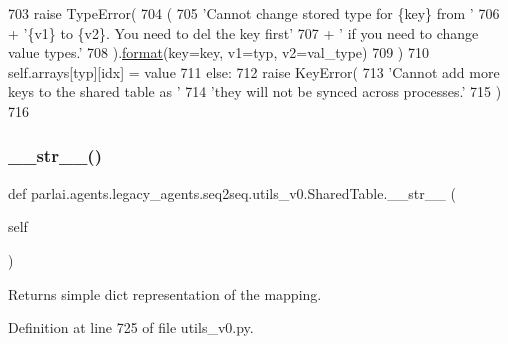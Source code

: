 \begin{DoxyCode}
703                 \textcolor{keywordflow}{raise} TypeError(
704                     (
705                         \textcolor{stringliteral}{'Cannot change stored type for \{key\} from '}
706                         + \textcolor{stringliteral}{'\{v1\} to \{v2\}. You need to del the key first'}
707                         + \textcolor{stringliteral}{' if you need to change value types.'}
708                     ).\hyperlink{namespaceparlai_1_1chat__service_1_1services_1_1messenger_1_1shared__utils_a32e2e2022b824fbaf80c747160b52a76}{format}(key=key, v1=typ, v2=val\_type)
709                 )
710             self.arrays[typ][idx] = value
711         \textcolor{keywordflow}{else}:
712             \textcolor{keywordflow}{raise} KeyError(
713                 \textcolor{stringliteral}{'Cannot add more keys to the shared table as '}
714                 \textcolor{stringliteral}{'they will not be synced across processes.'}
715             )
716 
\end{DoxyCode}
\mbox{\label{classparlai_1_1agents_1_1legacy__agents_1_1seq2seq_1_1utils__v0_1_1SharedTable_a678937ad3dcc29e6bda6898c6462950f}} 
\subsubsection{\texorpdfstring{\+\_\+\+\_\+str\+\_\+\+\_\+()}{\_\_str\_\_()}}
{\footnotesize\ttfamily def parlai.\+agents.\+legacy\+\_\+agents.\+seq2seq.\+utils\+\_\+v0.\+Shared\+Table.\+\_\+\+\_\+str\+\_\+\+\_\+ (\begin{DoxyParamCaption}\item[{}]{self }\end{DoxyParamCaption})}

\begin{DoxyVerb}Returns simple dict representation of the mapping.
\end{DoxyVerb}
 

Definition at line 725 of file utils\+\_\+v0.\+py.


